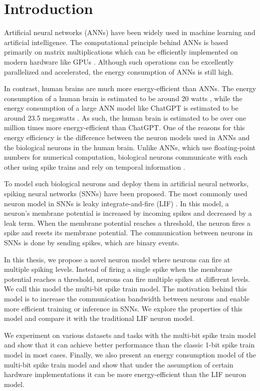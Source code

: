 \chapter{Introduction}
\label{chap:introduction}

Artificial neural networks (ANNs) \cite{mcculloch1943logical} have been widely used in machine learning and artificial intelligence. The computational principle behind ANNs is based primarily on matrix multiplications which can be efficiently implemented on modern hardware like GPUs \cite{oh2004gpu}. Although such operations can be excellently parallelized and accelerated, the energy consumption of ANNs is still high.

In contrast, human brains are much more energy-efficient than ANNs. The energy consumption of a human brain is estimated to be
around 20 watts \cite{doi:10.1073/pnas.2107022118}, while the energy consumption of a large ANN model like ChatGPT is estimated to be around 23.5 megawatts \cite{DEVRIES20232191}. As such, the human brain is estimated to be over one million times more energy-efficient than ChatGPT. One of the reasons for this energy efficiency is the difference between the neuron models used in ANNs and the biological neurons in the human brain. Unlike ANNs, which use floating-point numbers for numerical computation, biological neurons communicate with each other using spike trains and rely on temporal information \cite{jphysiol.1952.sp004764}.

To model such biological neurons and deploy them in artificial neural networks, spiking neural networks (SNNs) have been proposed. The most commonly used neuron model in SNNs is leaky integrate-and-fire (LIF) \cite{lapicque1907louis}. In this model, a neuron's membrane potential is increased by incoming spikes and decreased by a leak term. When the membrane potential reaches a threshold, the neuron fires a spike and resets its membrane potential. The communication between neurons in SNNs is done by sending spikes, which are binary events.

In this thesis, we propose a novel neuron model where neurons can fire at multiple spiking levels. Instead of firing a single spike when the membrane potential reaches a threshold, neurons can fire multiple spikes at different levels. We call this model the multi-bit spike train model. The motivation behind this model is to increase the communication bandwidth between neurons and enable more efficient training or inference in SNNs. We explore the properties of this model and compare it with the traditional LIF neuron model.

We experiment on various datasets and tasks with the multi-bit spike train model and show that it can achieve better performance than the classic 1-bit spike train model in most cases. Finally, we also present an energy consumption model of the multi-bit spike train model and show that under the assumption of certain hardware implementations it can be more energy-efficient than the LIF neuron model.

